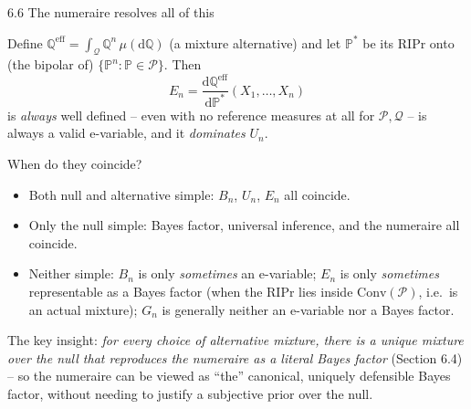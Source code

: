 \documentclass[aspectratio=169,10pt]{beamer}
\newcommand{\bP}{\mathbb{P}}
\newcommand{\bQ}{\mathbb{Q}}
\newcommand{\cP}{\mathcal{P}}
\newcommand{\cQ}{\mathcal{Q}}
\newcommand{\Conv}{\mathrm{Conv}}
\begin{document}
\begin{frame}[allowframebreaks]{6.6 The numeraire resolves all of this}

Define $\bQ^{\mathrm{eff}} = \int_{\cQ}\bQ^n\,\mu(\mathrm{d}\bQ)$ (a
mixture alternative) and let $\bP^*$ be its RIPr onto (the bipolar of)
$\{\bP^n : \bP\in\cP\}$. Then
\[
E_n = \frac{\mathrm{d}\bQ^{\mathrm{eff}}}{\mathrm{d}\bP^*}(X_1,\dots,X_n)
\]
is \emph{always} well defined -- even with no reference measures at all
for $\cP,\cQ$ -- is always a valid e-variable, and it \emph{dominates}
$U_n$.

\begin{block}{When do they coincide?}
\begin{itemize}
\item Both null and alternative simple: $B_n$, $U_n$, $E_n$ all coincide.
\item Only the null simple: Bayes factor, universal inference, and the
numeraire all coincide.
\item Neither simple: $B_n$ is only \emph{sometimes} an e-variable;
$E_n$ is only \emph{sometimes} representable as a Bayes factor (when
the RIPr lies inside $\Conv(\cP)$, i.e.\ is an actual mixture); $G_n$ is
generally neither an e-variable nor a Bayes factor.
\end{itemize}
\end{block}

The key insight: \emph{for every choice of alternative mixture, there
is a unique mixture over the null that reproduces the numeraire as a
literal Bayes factor} (Section 6.4) -- so the numeraire can be viewed
as ``the'' canonical, uniquely defensible Bayes factor, without needing
to justify a subjective prior over the null.
\end{frame}
\end{document}
